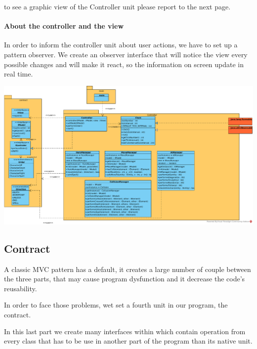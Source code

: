 \documentclass{report}
\begin{document}
to see a graphic view of the Controller unit please report to the next page.

\paragraph{About the controller and the view}

In order to inform the controller unit about user actions, we have to set up a pattern observer.
We create an observer interface that will notice the view every possible changes and will make it react, so the information on screen update in real time.

\begin{landscape}

\vspace*{\fill}

\includegraphics[scale=0.65]{resources/SVG/controler.pdf}

\vspace*{\fill}

\end{landscape}

\subsection{Contract}

A classic MVC pattern has a default, it creates a large number of couple between the three parts, that may cause program dysfunction and it decrease the code’s reusability.

In order to face those problems, wet set a fourth unit in our program, the contract. 

In this last part we create many interfaces within which contain operation from every class that has to be use in another part of the program than its native unit.
\end{document}
